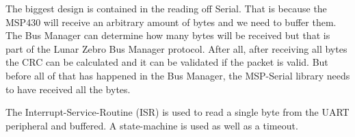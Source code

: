 The biggest design is contained in the reading off Serial. That is because the
MSP430 will receive an arbitrary amount of bytes and we need to buffer them.
The Bus Manager can determine how many bytes will be received but that is part
of the Lunar Zebro Bus Manager protocol. After all, after receiving all bytes
the CRC can be calculated and it can be validated if the packet is valid. But
before all of that has happened in the Bus Manager, the MSP-Serial library
needs to have received all the bytes. \newline

The Interrupt-Service-Routine (ISR) is used to read a single byte from the UART
peripheral and buffered. A state-machine is used as well as a timeout.

